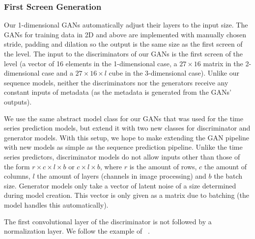 \subsubsection{First Screen Generation}
\label{sec:design-gans}

Our 1-dimensional GANs automatically adjust their layers to the input
size. The GANs for training data in 2D and above are implemented with
manually chosen stride, padding and dilation so the output is the same
size as the first screen of the level. The input to the discriminators
of our GANs is the first screen of the level (a vector of 16 elements
in the 1-dimensional case, a $27 \times 16$ matrix in the
2-dimensional case and a $27 \times 16 \times l$ cube in the
3-dimensional case). Unlike our sequence models, neither the
discriminators nor the generators receive any constant inputs of
metadata (as the metadata is generated from the GANs' outputs).

We use the same abstract model class for our GANs that was used for
the time series prediction models, but extend it with two new classes
for discriminator and generator models. With this setup, we hope to
make extending the GAN pipeline with new models as simple as the
sequence prediction pipeline. Unlike the time series predictors,
discriminator models do not allow inputs other than those of the form
$r \times c \times l \times b$ or $c \times l \times b$, where $r$ is
the amount of rows, $c$ the amount of columns, $l$ the amount of
layers (channels in image processing) and $b$ the batch size.
Generator models only take a vector of latent noise of a size
determined during model creation. This vector is only given as a
matrix due to batching (the model handles this automatically).

The first convolutional layer of the discriminator is not followed by
a normalization layer. We follow the example of~
.


